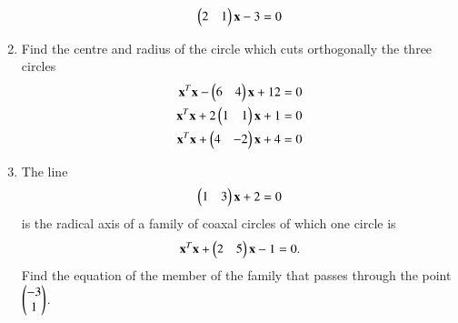 \begin{enumerate}[label=\arabic*.,ref=\thesubsection.\theenumi]
\begin{align}
\begin{pmatrix}2 & 1\end{pmatrix}\mathbf{x}-3 = 0
\end{align}
\item Find the centre and radius of the circle which cuts orthogonally the three circles
\begin{align}
\mathbf{x}^T\mathbf{x}-\begin{pmatrix}6 & 4\end{pmatrix}\mathbf{x}+12 = 0
\\
\mathbf{x}^T\mathbf{x}+2\begin{pmatrix}1 & 1\end{pmatrix}\mathbf{x}+1 = 0
\\
\mathbf{x}^T\mathbf{x}+\begin{pmatrix}4 & -2\end{pmatrix}\mathbf{x}+4 = 0
\end{align}
\item The line 
\begin{align}
\begin{pmatrix}1 & 3\end{pmatrix}\mathbf{x}+2 = 0
\end{align}
is the radical axis of a family of coaxal circles of which one circle is
\begin{align}
\mathbf{x}^T\mathbf{x}+\begin{pmatrix}2 & 5\end{pmatrix}\mathbf{x}-1 = 0.
\end{align}
Find the equation of the member of the family that passes through the point $\begin{pmatrix}-3\\1\end{pmatrix}$.
\end{enumerate}
